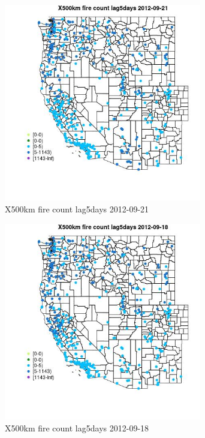 \begin{figure} 
\centering  
\includegraphics[width=0.77\textwidth]{Code_Outputs/Report_ML_input_PM25_Step4_part_e_de_duplicated_aves_compiled_2019-05-14wNAs_MapObsX500km_fire_count_lag5days2012-09-21.jpg} 
\caption{\label{fig:Report_ML_input_PM25_Step4_part_e_de_duplicated_aves_compiled_2019-05-14wNAsMapObsX500km_fire_count_lag5days2012-09-21}X500km fire count lag5days 2012-09-21} 
\end{figure} 
 

\begin{figure} 
\centering  
\includegraphics[width=0.77\textwidth]{Code_Outputs/Report_ML_input_PM25_Step4_part_e_de_duplicated_aves_compiled_2019-05-14wNAs_MapObsX500km_fire_count_lag5days2012-09-18.jpg} 
\caption{\label{fig:Report_ML_input_PM25_Step4_part_e_de_duplicated_aves_compiled_2019-05-14wNAsMapObsX500km_fire_count_lag5days2012-09-18}X500km fire count lag5days 2012-09-18} 
\end{figure} 
 

